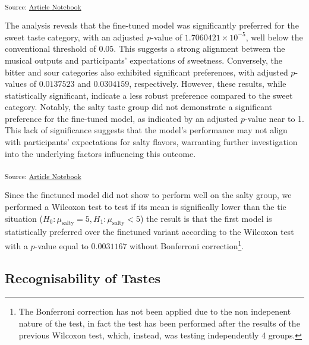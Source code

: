 \documentclass[
  letterpaper,
  DIV=11,
  numbers=noendperiod]{scrartcl}
\begin{document}
\textsubscript{Source:
\href{https://matteospanio.github.io/multimodal-symphony-survey-analysis/index.qmd.html}{Article
Notebook}}

The analysis reveals that the fine-tuned model was significantly
preferred for the sweet taste category, with an adjusted \(p\)-value of
\(\ensuremath{1.7060421\times 10^{-5}}\), well below the conventional
threshold of \(0.05\). This suggests a strong alignment between the
musical outputs and participants' expectations of sweetness. Conversely,
the bitter and sour categories also exhibited significant preferences,
with adjusted \(p\)-values of \(0.0137523\) and \(0.0304159\),
respectively. However, these results, while statistically significant,
indicate a less robust preference compared to the sweet category.
Notably, the salty taste group did not demonstrate a significant
preference for the fine-tuned model, as indicated by an adjusted
\(p\)-value near to 1. This lack of significance suggests that the
model's performance may not align with participants' expectations for
salty flavors, warranting further investigation into the underlying
factors influencing this outcome.

\textsubscript{Source:
\href{https://matteospanio.github.io/multimodal-symphony-survey-analysis/index.qmd.html}{Article
Notebook}}

Since the finetuned model did not show to perform well on the salty
group, we performed a Wilcoxon test to test if its mean is significally
lower than the tie situation
(\(H_0: \mu_{\text{salty}} = 5, H_1: \mu_{\text{salty}} < 5\)) the
result is that the first model is statistically preferred over the
finetuned variant according to the Wilcoxon test with a \(p\)-value
equal to \(0.0031167\) without Bonferroni correction\footnote{The
  Bonferroni correction has not been applied due to the non indepenent
  nature of the test, in fact the test has been performed after the
  results of the previous Wilcoxon test, which, instead, was testing
  independently 4 groups.}.

\subsection{Recognisability of Tastes}\label{recognisability-of-tastes}
\end{document}
